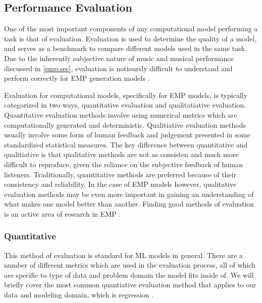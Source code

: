 \subsection{Performance Evaluation}
One of the most important components of any computational model performing a task is that of evaluation. Evaluation is used to determine the quality of a model, and serves as a benchmark to compare different models used in the same task. Due to the inherently subjective nature of music and musical performance discussed in \ref{emp:sec}, evaluation is notioursly difficult to understand and perform correctly for EMP generation models \cite{cancino2018computational}. 

Evaluation for computational models, specifically for EMP models, is typically categorized in two ways, quantitative evaluation and qualitatiative evaluation. Quantitative evaluation methods involve using numerical metrics which are computationally generated and deterministic. Qualitiative evaluation methods usually involve some form of human feedback and judgement presented in some standardized statistical measures. The key difference between quantitative and qualitiative is that qualitative methods are not as consisten and much more difficult to reproduce, given the reliance on the subjective feedback of human listeners. Traditionally, quantitative methods are preferred because of their consistency and reliability, In the case of EMP models however, qualitative evaluation methods may be even more important in gaining an understanding of what makes one model better than another. Finding good methods of evaluation is an active area of research in EMP \cite{cancino2018computational}. 

\subsubsection{Quantitative}
This method of evaluation is standard for ML models in general. There are a number of different metrics which are used in the evaluation process, all of which are specific to type of data and problem domain the model fits inside of. We will briefly cover the most common quantiative evaluation method that applies to our data and modeling domain, which is regression . 


